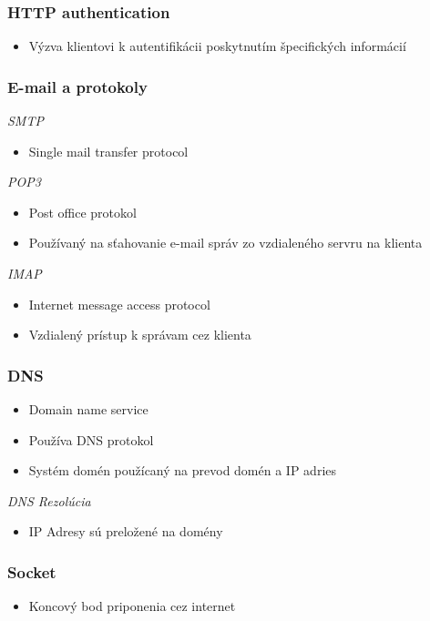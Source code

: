\documentclass[10pt,xcolor=pdflatex,hyperref={unicode}]{beamer}
\begin{document}
    \begin{frame}
        \frametitle{HTTP authentication}
        \begin{itemize}
            \item Výzva klientovi k autentifikácii poskytnutím špecifických informácií
        \end{itemize}
    \end{frame}

    \begin{frame}
        \frametitle{E-mail a protokoly}
        \emph{SMTP}
        \begin{itemize}
            \item Single mail transfer protocol
        \end{itemize}
        \emph{POP3}
        \begin{itemize}
            \item Post office protokol
            \item Používaný na sťahovanie e-mail správ zo vzdialeného servru na klienta
        \end{itemize}
        \emph{IMAP}
        \begin{itemize}
            \item Internet message access protocol
            \item Vzdialený prístup k správam cez klienta
        \end{itemize}
    \end{frame}

    \begin{frame}\frametitle{DNS}
        \begin{itemize}
            \item Domain name service
            \item Používa DNS protokol
            \item Systém domén použícaný na prevod domén a IP adries
        \end{itemize}
        \emph{DNS Rezolúcia}
        \begin{itemize}
            \item IP Adresy sú preložené na domény
        \end{itemize}
    \end{frame}

    \begin{frame}\frametitle{Socket}
        \begin{itemize}
            \item Koncový bod priponenia cez internet
        \end{itemize}
    \end{frame}

\end{document}
